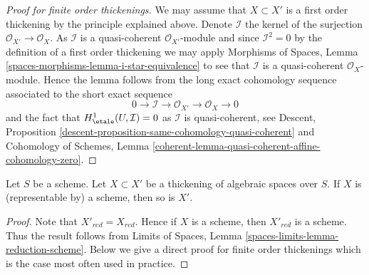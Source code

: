 \begin{proof}[Proof for finite order thickenings]
We may assume that $X \subset X'$ is a first order thickening by the
principle explained above. Denote $\mathcal{I}$ the kernel of the surjection
$\mathcal{O}_{X'} \to \mathcal{O}_X$. As $\mathcal{I}$ is a quasi-coherent
$\mathcal{O}_{X'}$-module and since $\mathcal{I}^2 = 0$ by the definition
of a first order thickening we may apply
Morphisms of Spaces, Lemma
\ref{spaces-morphisms-lemma-i-star-equivalence}
to see that $\mathcal{I}$ is a quasi-coherent $\mathcal{O}_X$-module.
Hence the lemma follows from the long exact cohomology sequence
associated to the short exact sequence
$$
0 \to \mathcal{I} \to \mathcal{O}_{X'} \to \mathcal{O}_X \to 0
$$
and the fact that $H^1_\etale(U, \mathcal{I}) = 0$ as
$\mathcal{I}$ is quasi-coherent, see
Descent, Proposition \ref{descent-proposition-same-cohomology-quasi-coherent}
and Cohomology of Schemes, Lemma
\ref{coherent-lemma-quasi-coherent-affine-cohomology-zero}.
\end{proof}

\begin{lemma}
\label{lemma-thickening-scheme}
Let $S$ be a scheme. Let $X \subset X'$ be a thickening of algebraic spaces
over $S$. If $X$ is (representable by) a scheme, then so is $X'$.
\end{lemma}

\begin{proof}
Note that $X'_{red} = X_{red}$. Hence if $X$ is a scheme, then
$X'_{red}$ is a scheme. Thus the result follows from
Limits of Spaces, Lemma
\ref{spaces-limits-lemma-reduction-scheme}.
Below we give a direct proof for finite order thickenings which is
the case most often used in practice.
\end{proof}

